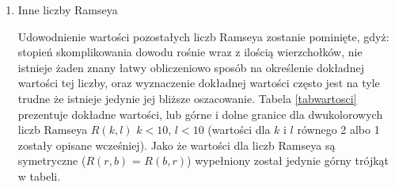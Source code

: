 \begin{enumerate}
\item Inne liczby Ramseya \hfill \par

 Udowodnienie wartości pozostałych liczb Ramseya zostanie pominięte, gdyż: stopień skomplikowania dowodu rośnie wraz z ilością wierzchołków, nie istnieje żaden znany łatwy obliczeniowo sposób na określenie dokładnej wartości tej liczby, oraz wyznaczenie dokładnej wartości często jest na tyle trudne że istnieje jedynie jej bliższe oszacowanie. Tabela \ref{tabwartosci} prezentuje dokładne wartości, lub górne i dolne granice dla dwukolorowych liczb Ramseya $R(k,l)$ $k<10$, $l<10$ (wartości dla $k$ i $l$ równego 2 albo 1 zostały opisane wcześniej). Jako że wartości dla liczb Ramseya są symetryczne ($R(r,b)$ = $R(b,r)$) wypełniony został jedynie górny trójkąt w tabeli.
 

\end{enumerate}
